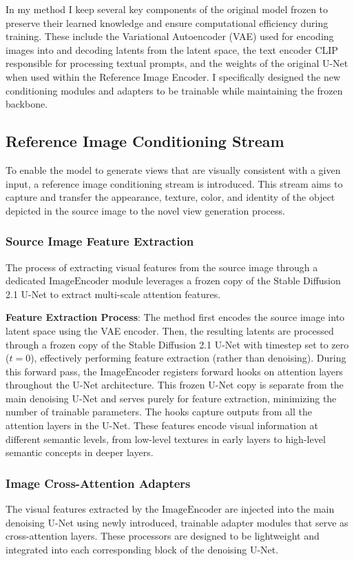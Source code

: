 In my method I keep several key components of the original model frozen to preserve their learned knowledge and ensure computational efficiency during training. These include the Variational Autoencoder (VAE) \cite{vae} used for encoding images into and decoding latents from the latent space, the text encoder CLIP \cite{clip} responsible for processing textual prompts, and the weights of the original U-Net when used within the Reference Image Encoder. I specifically designed the new conditioning modules and adapters to be trainable while maintaining the frozen backbone.

\subsection{Reference Image Conditioning Stream}
To enable the model to generate views that are visually consistent with a given input, a reference image conditioning stream is introduced. This stream aims to capture and transfer the appearance, texture, color, and identity of the object depicted in the source image to the novel view generation process.

\subsubsection{Source Image Feature Extraction}
The process of extracting visual features from the source image through a dedicated $\text{ImageEncoder}$ module leverages a frozen copy of the Stable Diffusion 2.1 U-Net to extract multi-scale attention features.

\textbf{Feature Extraction Process}: The method first encodes the source image into latent space using the VAE encoder. Then, the resulting latents are processed through a frozen copy of the Stable Diffusion 2.1 U-Net with timestep set to zero ($t=0$), effectively performing feature extraction (rather than denoising). During this forward pass, the $\text{ImageEncoder}$ registers forward hooks on attention layers throughout the U-Net architecture. This frozen U-Net copy is separate from the main denoising U-Net and serves purely for feature extraction, minimizing the number of trainable parameters. The hooks capture outputs from all the attention layers in the U-Net. These features encode visual information at different semantic levels, from low-level textures in early layers to high-level semantic concepts in deeper layers.

\subsubsection{Image Cross-Attention Adapters}
The visual features extracted by the $\text{ImageEncoder}$ are injected into the main denoising U-Net using newly introduced, trainable adapter modules that serve as cross-attention layers. These processors are designed to be lightweight and integrated into each corresponding block of the denoising U-Net.

